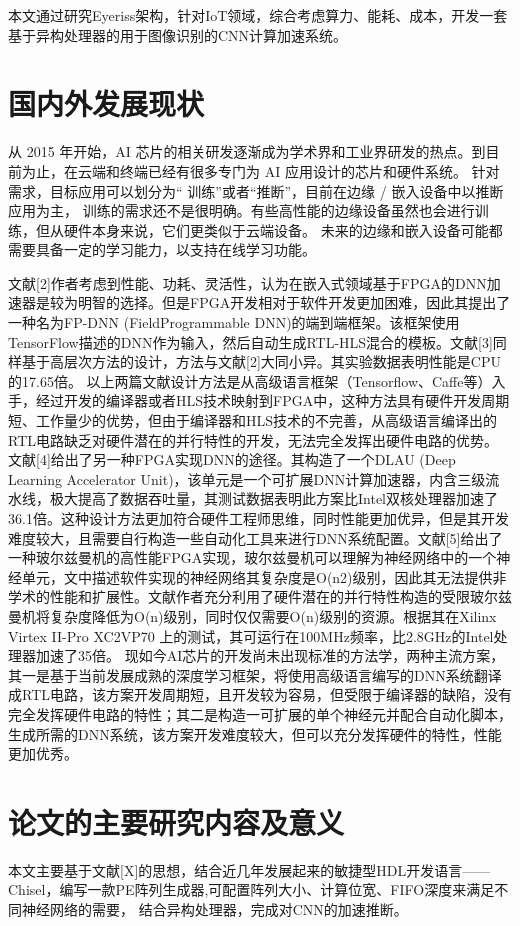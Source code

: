     本文通过研究Eyeriss架构，针对IoT领域，综合考虑算力、能耗、成本，开发一套基于异构处理器的用于图像识别的CNN计算加速系统。

\section{国内外发展现状}
    从 2015 年开始，AI 芯片的相关研发逐渐成为学术界和工业界研发的热点。到目前为止，在云端和终端已经有很多专门为 AI 应用设计的芯片和硬件系统。
    针对需求，目标应用可以划分为“ 训练”或者“推断”，目前在边缘 / 嵌入设备中以推断应用为主，
    训练的需求还不是很明确。有些高性能的边缘设备虽然也会进行训练，但从硬件本身来说，它们更类似于云端设备。
    未来的边缘和嵌入设备可能都需要具备一定的学习能力，以支持在线学习功能。

    文献[2]作者考虑到性能、功耗、灵活性，认为在嵌入式领域基于FPGA的DNN加速器是较为明智的选择。但是FPGA开发相对于软件开发更加困难，因此其提出了一种名为FP-DNN (FieldProgrammable DNN)的端到端框架。该框架使用TensorFlow描述的DNN作为输入，然后自动生成RTL-HLS混合的模板。文献[3]同样基于高层次方法的设计，方法与文献[2]大同小异。其实验数据表明性能是CPU的17.65倍。
    以上两篇文献设计方法是从高级语言框架（Tensorflow、Caffe等）入手，经过开发的编译器或者HLS技术映射到FPGA中，这种方法具有硬件开发周期短、工作量少的优势，但由于编译器和HLS技术的不完善，从高级语言编译出的RTL电路缺乏对硬件潜在的并行特性的开发，无法完全发挥出硬件电路的优势。
    文献[4]给出了另一种FPGA实现DNN的途径。其构造了一个DLAU (Deep Learning Accelerator Unit)，该单元是一个可扩展DNN计算加速器，内含三级流水线，极大提高了数据吞吐量，其测试数据表明此方案比Intel双核处理器加速了36.1倍。这种设计方法更加符合硬件工程师思维，同时性能更加优异，但是其开发难度较大，且需要自行构造一些自动化工具来进行DNN系统配置。文献[5]给出了一种玻尔兹曼机的高性能FPGA实现，玻尔兹曼机可以理解为神经网络中的一个神经单元，文中描述软件实现的神经网络其复杂度是O(n2)级别，因此其无法提供非学术的性能和扩展性。文献作者充分利用了硬件潜在的并行特性构造的受限玻尔兹曼机将复杂度降低为O(n)级别，同时仅仅需要O(n)级别的资源。根据其在Xilinx Virtex II-Pro XC2VP70 上的测试，其可运行在100MHz频率，比2.8GHz的Intel处理器加速了35倍。
    现如今AI芯片的开发尚未出现标准的方法学，两种主流方案，其一是基于当前发展成熟的深度学习框架，将使用高级语言编写的DNN系统翻译成RTL电路，该方案开发周期短，且开发较为容易，但受限于编译器的缺陷，没有完全发挥硬件电路的特性；其二是构造一可扩展的单个神经元并配合自动化脚本，生成所需的DNN系统，该方案开发难度较大，但可以充分发挥硬件的特性，性能更加优秀。

\section{论文的主要研究内容及意义}
    本文主要基于文献[X]的思想，结合近几年发展起来的敏捷型HDL开发语言——Chisel，编写一款PE阵列生成器,可配置阵列大小、计算位宽、FIFO深度来满足不同神经网络的需要，
    结合异构处理器，完成对CNN的加速推断。


